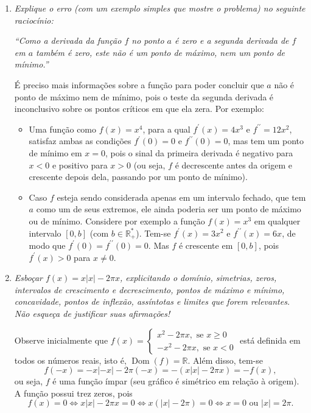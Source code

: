 \documentclass[12pt,a4paper]{article}
\newcommand*\abs[1]{\left|#1\right|}
\newcommand*\dom[1]{\operatorname{Dom}\left(#1\right)}
\newcommand*\R{\mathbb{R}}
\begin{document}
\begin{enumerate}
\item \textit{Explique o erro (com um exemplo simples que mostre o problema) no seguinte raciocínio:}

\textit{``Como a derivada da função $f$ no ponto $a$ é zero e a segunda derivada de $f$ em $a$ também é zero, este não é um ponto de máximo, nem um ponto de mínimo.''}

É preciso mais informações sobre a função para poder concluir que $a$ não é ponto de máximo nem de mínimo, pois o teste da segunda derivada é inconclusivo sobre os pontos críticos em que ela zera. Por exemplo:
\begin{itemize}
\item Uma função como $f(x) = x^4$, para a qual $f^\prime(x) = 4x^3$ e $f^{\prime \prime } = 12x^2$, satisfaz ambas as condições $f^\prime(0) = 0$ e $f^{\prime\prime}(0) = 0$, mas tem um ponto de mínimo em $x=0$, pois o sinal da primeira derivada é negativo para $x<0$ e positivo para $x>0$ (ou seja, $f$ é decrescente antes da origem e crescente depois dela, passando por um ponto de mínimo).
\item Caso $f$ esteja sendo considerada apenas em um intervalo fechado, que tem $a$ como um de seus extremos, ele ainda poderia ser um ponto de máximo ou de mínimo. Considere por exemplo a função $f(x) = x^3$ em qualquer intervalo $[0, b]$ (com $b \in \R^*_+$). Tem-se $f^\prime(x) = 3x^2$ e $f^{\prime \prime }(x) = 6x$, de modo que $f^\prime(0) = f^{\prime\prime}(0) = 0$. Mas $f$ é crescente em $[0,b]$, pois $f^\prime(x) > 0$ para $x \neq 0$.
\end{itemize}


\item \textit{Esboçar $f(x) = x\abs{x} - 2\pi x$, explicitando o domínio, simetrias, zeros, intervalos de crescimento e decrescimento, pontos de máximo e mínimo, concavidade, pontos de inflexão, assíntotas e limites que forem relevantes. Não esqueça de justificar suas afirmações!}

Observe inicialmente que $f(x)
= \begin{cases}
x^2-2\pi x, \text{ se } x \geq 0 \\
-x^2-2\pi x, \text{ se } x < 0
\end{cases}$
está definida em todos os números reais, isto é,
$\dom{f} = \R$. Além disso, tem-se
\[
f(-x)
= -x \abs{-x} - 2 \pi (-x)
= -( x \abs{x} - 2 \pi x )
= -f(x),\]
ou seja, $f$ é uma função ímpar (seu gráfico é simétrico em relação à origem). A função possui trez zeros, pois
\[
f(x) = 0
\Leftrightarrow x\abs{x} - 2\pi x = 0
\Leftrightarrow x(\abs{x} - 2\pi) = 0
\Leftrightarrow x = 0 \text{ ou } \abs{x} = 2\pi.
\]


\end{enumerate}
\end{document}
